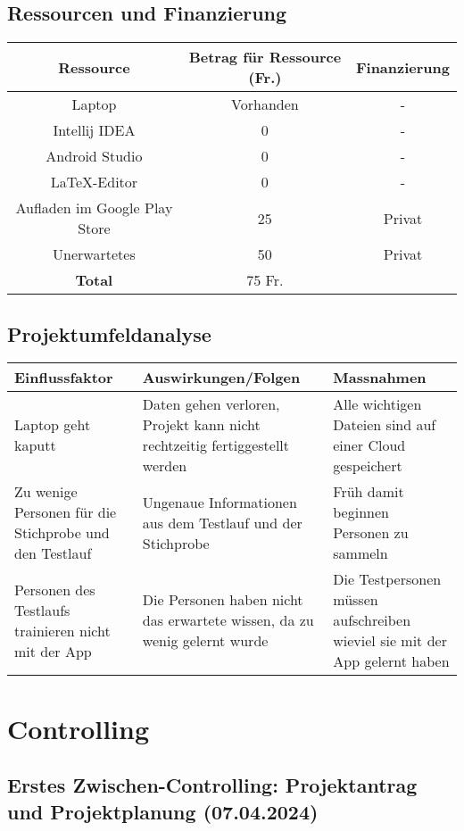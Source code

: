 \documentclass{report}
\begin{document}
\section{Ressourcen und Finanzierung}

\begin{center}
\begin{tabular}{c|c|c}
    \textbf{Ressource} & \textbf{Betrag für Ressource (Fr.)} & \textbf{Finanzierung} \\ \hline
    Laptop & Vorhanden & - \\
    Intellij IDEA & 0 & - \\
    Android Studio & 0 & - \\
    \LaTeX -Editor & 0 & - \\
    Aufladen im Google Play Store & 25 & Privat \\
    Unerwartetes & 50 & Privat \\ \hline
    \textbf{Total} & 75 Fr. & 
\end{tabular}
\end{center}

\section{Projektumfeldanalyse}
\begin{tabular}{p{}|p{}|p{}}
    \textbf{Einflussfaktor} & \textbf{Auswirkungen/Folgen} & \textbf{Massnahmen} \\ \hline
    Laptop geht kaputt & Daten gehen verloren, Projekt kann nicht rechtzeitig fertiggestellt werden & Alle wichtigen Dateien sind auf einer Cloud gespeichert \\ \hline
    Zu wenige Personen für die Stichprobe und den Testlauf & Ungenaue Informationen aus dem Testlauf und der Stichprobe & Früh damit beginnen Personen zu sammeln \\ \hline
    Personen des Testlaufs trainieren nicht mit der App & Die Personen haben nicht das erwartete wissen, da zu wenig gelernt wurde & Die Testpersonen müssen aufschreiben wieviel sie mit der App gelernt haben \\
\end{tabular}

\setcounter{chapter}{4}
\chapter{Controlling}
\section{Erstes Zwischen-Controlling: Projektantrag und Projektplanung (07.04.2024)}
\end{document}
